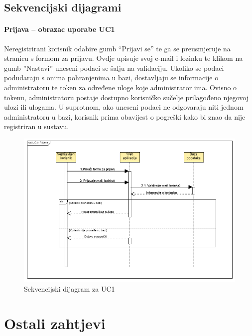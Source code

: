 			\subsection{Sekvencijski dijagrami}
			
				\paragraph{Prijava – obrazac uporabe UC1}\mbox{}
				\noindent Neregistrirani korisnik odabire gumb “Prijavi se” te ga se preusmjeruje na stranicu s formom za prijavu. Ovdje upisuje svoj e-mail i lozinku te klikom na gumb ”Nastavi” uneseni podaci se šalju na validaciju. Ukoliko se podaci podudaraju s onima pohranjenima  u bazi, dostavljaju se informacije o administratoru te token za određene uloge koje administrator ima. Ovisno o tokenu, administratoru postaje dostupno korisničko sučelje prilagođeno njegovoj ulozi ili ulogama. U suprotnom, ako uneseni podaci ne odgovaraju niti jednom administratoru u bazi, korisnik prima obavijest o pogreški kako bi znao da nije registriran u sustavu. 
				
				\begin{figure}[H]
					\includegraphics[width=\textwidth]{slike/sd1.PNG} %
					\caption{Sekvencijski dijagram za UC1}
					\label{fig:sd1} %
				\end{figure}
				
				
				\eject
	
		\section{Ostali zahtjevi}
		
